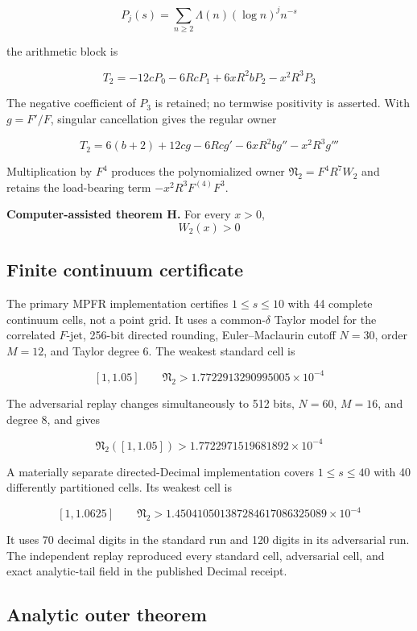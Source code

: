 \documentclass[
  11pt,
]{book}
\renewenvironment{quote}
  {\begin{tcolorbox}[
      enhanced,
      breakable,
      colback=tncream,
      colframe=tnrust,
      boxrule=0.8pt,
      arc=1.5pt,
      left=7pt,
      right=7pt,
      top=6pt,
      bottom=6pt]}
  {\end{tcolorbox}}
\begin{document}
\[
P_j(s)=\sum_{n\ge2}\Lambda(n)(\log n)^j n^{-s}
\]

the arithmetic block is

\[
T_2=-12cP_0-6RcP_1+6xR^2bP_2-x^2R^3P_3
\tag{36.2}
\]

The negative coefficient of \(P_3\) is retained; no termwise positivity
is asserted. With \(g=F'/F\), singular cancellation gives the regular
owner

\[
T_2=6(b+2)+12cg-6Rcg'-6xR^2bg''-x^2R^3g'''
\tag{36.3}
\]

Multiplication by \(F^4\) produces the polynomialized owner
\(\mathfrak N_2=F^4R^7W_2\) and retains the load-bearing term
\(-x^2R^3F^{(4)}F^3\).

\begin{quote}
\textbf{Computer-assisted theorem H.} For every \(x>0\), \[
\boxed{W_2(x)>0}
\]
\end{quote}

\subsection{Finite continuum
certificate}\label{finite-continuum-certificate}

The primary MPFR implementation certifies \(1\le s\le10\) with 44
complete continuum cells, not a point grid. It uses a common-\(\delta\)
Taylor model for the correlated \(F\)-jet, 256-bit directed rounding,
Euler--Maclaurin cutoff \(N=30\), order \(M=12\), and Taylor degree
\(6\). The weakest standard cell is

\[
[1,1.05]
\qquad
\mathfrak N_2>1.7722913290995005\times10^{-4}
\]

The adversarial replay changes simultaneously to 512 bits, \(N=60\),
\(M=16\), and degree \(8\), and gives

\[
\mathfrak N_2([1,1.05])
>1.7722971519681892\times10^{-4}
\]

A materially separate directed-Decimal implementation covers
\(1\le s\le40\) with 40 differently partitioned cells. Its weakest cell
is

\[
[1,1.0625]
\qquad
\mathfrak N_2>
1.450410501387284617086325089\times10^{-4}
\]

It uses 70 decimal digits in the standard run and 120 digits in its
adversarial run. The independent replay reproduced every standard cell,
adversarial cell, and exact analytic-tail field in the published Decimal
receipt.

\subsection{Analytic outer theorem}\label{analytic-outer-theorem}
\end{document}
